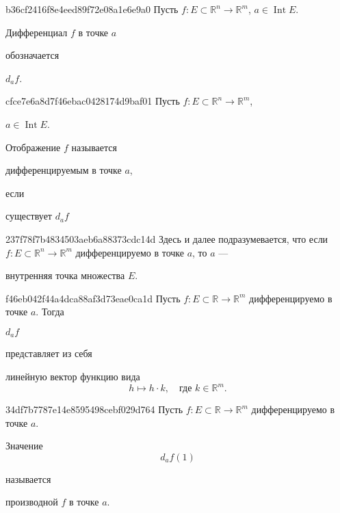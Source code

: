 \begin{note}{b36cf2416f8e4eed89f72e08a1e6e9a0}
    Пусть \({ f : E  \subset \mathbb R^{n} \to \mathbb R^{m} }\), \({ a \in \operatorname{Int} E }\).
    \begin{icloze}{2}Дифференциал \({ f }\) в точке \({ a }\)\end{icloze} обозначается \begin{icloze}{1}\({ d_a f }\).\end{icloze}
\end{note}

\begin{note}{cfce7e6a8d7f46ebac0428174d9baf01}
    Пусть \({ f : E  \subset \mathbb R^{n} \to \mathbb R^{m} }\), \begin{icloze}{3}\({ a \in \operatorname{Int} E }\).\end{icloze}
    Отображение \({ f }\) называется \begin{icloze}{2}дифференцируемым в точке \({ a }\),\end{icloze} если \begin{icloze}{1}существует \({ d_a f }\)\end{icloze}
\end{note}

\begin{note}{237f78f7b4834503aeb6a88373cdc14d}
    Здесь и далее подразумевается, что если \({ f : E \subset \mathbb R^{n} \to \mathbb R^{m} }\) дифференцируемо в точке \({ a }\), то \({ a }\) --- \begin{icloze}{1}внутренняя точка множества \({ E }\).\end{icloze}
\end{note}

\begin{note}{f46eb042f44a4dca88af3d73eae0ca1d}
    Пусть \({ f : E \subset \mathbb R \to \mathbb R^{m} }\) дифференцируемо в точке \({ a }\).
    Тогда \begin{icloze}{2}\({ d_{a} f }\)\end{icloze} представляет из себя
    \begin{icloze}{1}линейную вектор функцию вида
        \[
            h \mapsto h \cdot k, \quad \text{где \({ k \in \mathbb R^{m} }\)}.
        \]
    \end{icloze}
\end{note}

\begin{note}{34df7b7787e14e8595498cebf029d764}
    Пусть \({ f : E \subset \mathbb R \to \mathbb R^{m} }\) дифференцируемо в точке \({ a }\).
    \begin{icloze}{2}
        Значение
        \[
            d_{a}f(1)
        \]
    \end{icloze}
    называется \begin{icloze}{1}производной \({ f }\) в точке \({ a }\).\end{icloze}
\end{note}

